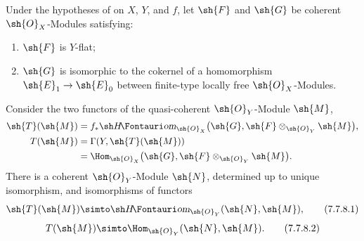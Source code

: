 \begin{corollary}[7.7.8]
\label{III.7.7.8}
Under the hypotheses of  on $X$, $Y$, and
$f$, let $\sh{F}$ and $\sh{G}$ be coherent
$\sh{O}_X$-Modules satisfying:
\begin{enumerate}
  \item[(i)] $\sh{F}$ is $Y$-flat;
  \item[(ii)] $\sh{G}$ is isomorphic to the cokernel of a
    homomorphism
    $\sh{E}_1\to\sh{E}_0$ between finite-type locally free
    $\sh{O}_X$-Modules.
\end{enumerate}
Consider the two functors of the quasi-coherent
$\sh{O}_Y$-Module $\sh{M}$,
\begin{align*}
  \sh{T}(\sh{M})
  &=
  f_*\shHom_{\sh{O}_X}
  \bigl(
    \sh{G},
    \sh{F}\otimes_{\sh{O}_Y}\sh{M}
  \bigr),\\
  T(\sh{M})
  &=
  \Gamma(Y,\sh{T}(\sh{M}))\\
  &=
  \Hom_{\sh{O}_X}
  \bigl(
    \sh{G},
    \sh{F}\otimes_{\sh{O}_Y}\sh{M}
  \bigr).
\end{align*}
There is a coherent $\sh{O}_Y$-Module $\sh{N}$, determined
up to unique isomorphism, and isomorphisms of functors
\[
  \sh{T}(\sh{M})
  \simto
  \shHom_{\sh{O}_Y}(\sh{N},\sh{M}),
  \tag{7.7.8.1}\label{III.7.7.8.1}
\]
\[
  T(\sh{M})
  \simto
  \Hom_{\sh{O}_Y}(\sh{N},\sh{M}).
  \tag{7.7.8.2}\label{III.7.7.8.2}
\]
\end{corollary}

